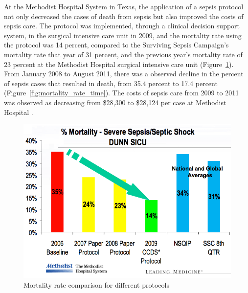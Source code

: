 \documentclass{sig-alternate}
\begin{document}
At the Methodist Hospital System in Texas, the application of a sepsis protocol not only decreased the cases of death from sepsis but also improved the costs of sepsis care. The protocol was implemented, through a clinical decision support system, in the surgical intensive care unit in 2009, and the mortality rate using the protocol was 14 percent, compared to the Surviving Sepsis Campaign's mortality rate that year of 31 percent, and the previous year's mortality rate of 23 percent at the Methodist Hospital surgical intensive care unit (Figure~\ref{fig:mortality_rate}). From January 2008 to August 2011, there was a observed decline in the percent of sepsis cases that resulted in death, from 35.4 percent to 17.4 percent (Figure~\ref{fig:mortality_rate_time}). The costs of sepsis care from 2009 to 2011 was observed as decreasing from \$28,300 to \$28,124 per case at Methodist Hospital \cite{methodist}.

\begin{figure}
	\begin{center}
		\includegraphics[width=1.0\linewidth]{methodist1.png}
	\end{center}
	\caption{Mortality rate comparison for different protocols}
	\label{fig:mortality_rate}
\end{figure}
\end{document}

